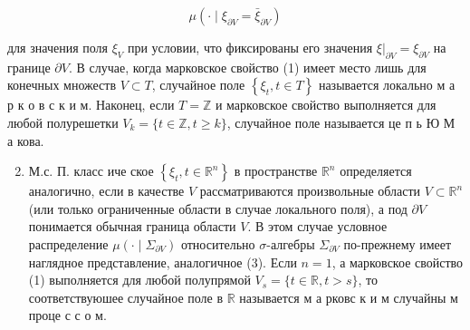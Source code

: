 \documentclass[10pt]{article}
\begin{document}
\[

\mu\left(\cdot \mid \xi_{\partial V}=\bar{\xi}_{\partial V}\right)

\]



для значения поля $\xi_{V}$ при условии, что фиксированы его значения $\left.\xi\right|_{\partial V}=\xi_{\partial V}$ на границе $\partial V$. В случае, когда марковское свойство (1) имеет место лишь для конечных множеств $V \subset T$, случайное поле $\left\{\xi_{t}, t \in T\right\}$ называется локально м а р к о в с к и м. Наконец, если $T=\mathbb{Z}$ и марковское свойство выполняется для любой полурешетки $V_{k}=\{t \in \mathbb{Z}, t \geqslant k\}$, случайное поле называется це п ь Ю М а кова.



\begin{enumerate}

  \setcounter{enumi}{1}

  \item М.с. П. класс иче ское $\left\{\xi_{t}, t \in \mathbb{R}^{n}\right\}$ в пространстве $\mathbb{R}^{n}$ определяется аналогично, если в качестве $V$ рассматриваются произвольные области $V \subset \mathbb{R}^{n}$ (или только ограниченные области в случае локального поля), а под $\partial V$ понимается обычная граница области $V$. В этом случае условное распределение $\mu\left(\cdot \mid \Sigma_{\partial V}\right)$ относительно $\sigma$-алгебры $\Sigma_{\partial V}$ по-прежнему имеет наглядное представление, аналогичное (3). Если $n=1$, а марковское свойство (1) выполняется для любой полупрямой $V_{s}=\{t \in \mathbb{R}, t>s\}$, то соответствуюшее случайное поле в $\mathbb{R}$ называется м а рковс к и м случайны м проце с с о м.




\end{enumerate}
\end{document}
